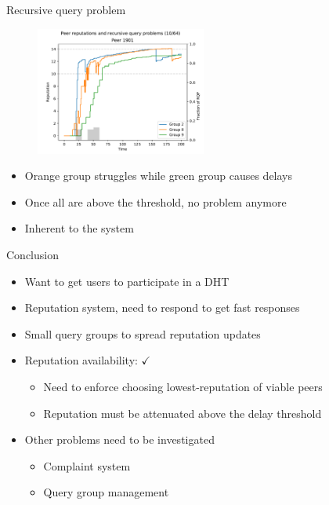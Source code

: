 \documentclass[presentation,english,usenames,dvipsnames]{beamer}
\begin{document}
\begin{frame}{Recursive query problem}
  \begin{figure}
    \centering
    \includegraphics[width=0.5\textwidth]{figures/selection_overlap_rep_sorted_peer_reps_with_rqp_10_of_64}
  \end{figure}
  \begin{itemize}
    \item Orange group struggles while green group causes delays
    \item Once all are above the threshold, no problem anymore
    \item Inherent to the system
  \end{itemize}
\end{frame}

\begin{frame}{Conclusion}
  \begin{itemize}
    \item Want to get users to participate in a DHT
    \item Reputation system, need to respond to get fast responses
    \item Small query groups to spread reputation updates
    \item Reputation availability: $\checkmark$
    \begin{itemize}
      \item Need to enforce choosing lowest-reputation of viable peers
      \item Reputation must be attenuated above the delay threshold
    \end{itemize}
    \item Other problems need to be investigated
    \begin{itemize}
      \item Complaint system
      \item Query group management
    \end{itemize}
  \end{itemize}
\end{frame}
\end{document}
